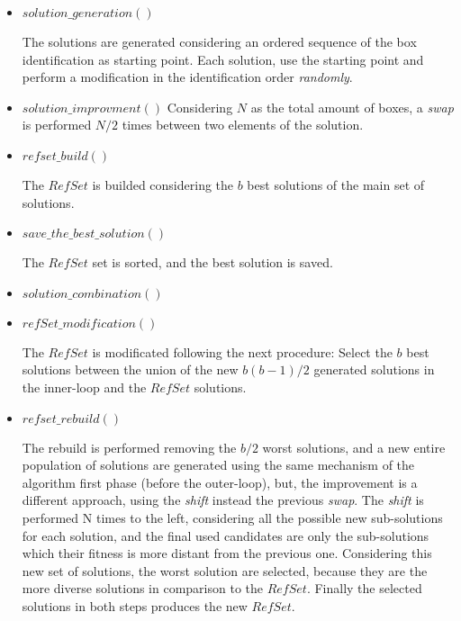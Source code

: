 \begin{itemize}
    \item $solution\_generation()$

        The solutions are generated considering an ordered sequence of the box identification as starting point.
        Each solution, use the starting point and perform a modification in the identification order \emph{randomly}.
    \item $solution\_improvment()$
        Considering $N$ as the total amount of boxes,
        a \emph{swap} is performed $N/2$ times between two elements of the solution.
    \item $refset\_build()$

        The $RefSet$ is builded considering the $b$ best solutions of the main set of solutions.
    \item $save\_the\_best\_solution()$

        The $RefSet$ set is sorted, and the best solution is saved.
    \item $solution\_combination()$

    \item $refSet\_modification()$

        The $RefSet$ is modificated following the next procedure:
        Select the $b$ best solutions between the union of the new
        $b(b-1)/2$ generated solutions in the inner-loop and the $RefSet$ solutions.
    \item $refset\_rebuild()$

        The rebuild is performed removing the $b/2$ worst solutions,
        and a new entire population of solutions are generated
        using the same mechanism of the algorithm first phase (before the outer-loop),
        but, the improvement is a different approach, using the \emph{shift} instead
        the previous \emph{swap}.
        The \emph{shift} is performed N times to the left,
        considering all the possible new sub-solutions for each solution,
        and the final used candidates are only the sub-solutions which their fitness
        is more distant from the previous one.
        Considering this new set of solutions, the worst solution are selected,
        because they are the more diverse solutions in comparison to the $RefSet$.
        Finally the selected solutions in both steps produces the new $RefSet$.
\end{itemize}
